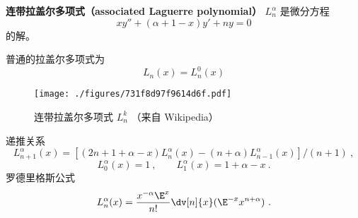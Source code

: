 
\begin{issues}
\issueDraft
\end{issues}

\textbf{连带拉盖尔多项式（associated Laguerre polynomial）} $L_{n}^\alpha$ 是微分方程
\begin{equation}
xy'' + (\alpha + 1 - x) y' + ny = 0
\end{equation}
的解。

普通的拉盖尔多项式为
\begin{equation}
L_n(x) = L_n^0(x)
\end{equation}

\begin{figure}[ht]
\centering
\texttt{[image: ./figures/731f8d97f9614d6f.pdf]}
\caption{连带拉盖尔多项式 $L_n^k$ （来自 Wikipedia）} \label{fig_Laguer_1}
\end{figure}

递推关系
\begin{equation}
L_{n+1}^\alpha (x) = [(2n + 1 + \alpha  - x)L_n^\alpha (x) - (n + \alpha )L_{n - 1}^\alpha (x)]/(n + 1)~,
\end{equation}
\begin{equation}
L_0^\alpha (x) = 1~,
\qquad
L_1^\alpha (x) = 1 + \alpha  - x~.
\end{equation}  
罗德里格斯公式
\begin{equation}
L_n^\alpha (x) = \frac{x^{-\alpha} \E^x}{n!} \dv[n]{x} (\E^{-x} x^{n+\alpha})~.
\end{equation}
